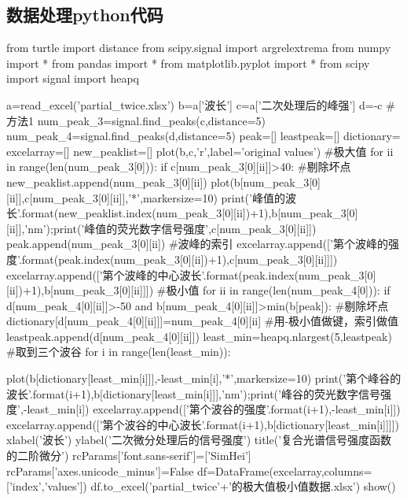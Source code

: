 \documentclass{article}
\numberwithin{equation}{subsection}
\begin{document}
\subsection{数据处理python代码}
\begin{python}
from turtle import distance
from scipy.signal import argrelextrema
from numpy import *
from pandas import *
from matplotlib.pyplot import *
from scipy import signal
import heapq

a=read_excel('partial_twice.xlsx')
b=a['波长']
c=a['二次处理后的峰强']
d=-c
#方法1
num_peak_3=signal.find_peaks(c,distance=5)
num_peak_4=signal.find_peaks(d,distance=5)
peak=[]
leastpeak=[]
dictionary={}
excelarray=[]
new_peaklist=[]
plot(b,c,'r',label='original values')
#极大值
for ii in range(len(num_peak_3[0])):
    if c[num_peak_3[0][ii]]>40:          #剔除坏点
        new_peaklist.append(num_peak_3[0][ii])
        plot(b[num_peak_3[0][ii]],c[num_peak_3[0][ii]],'*',markersize=10) 
        print('峰值{}的波长'.format(new_peaklist.index(num_peak_3[0][ii])+1),b[num_peak_3[0][ii]],'nm');print('峰值的荧光数字信号强度',c[num_peak_3[0][ii]])
        peak.append(num_peak_3[0][ii])          #波峰的索引
        excelarray.append(['第{}个波峰的强度'.format(peak.index(num_peak_3[0][ii])+1),c[num_peak_3[0][ii]]])
        excelarray.append(['第{}个波峰的中心波长'.format(peak.index(num_peak_3[0][ii])+1),b[num_peak_3[0][ii]]])
#极小值
for ii in range(len(num_peak_4[0])):
    if  d[num_peak_4[0][ii]]>-50 and b[num_peak_4[0][ii]]>min(b[peak]):          #剔除坏点
        dictionary[d[num_peak_4[0][ii]]]=num_peak_4[0][ii]          #用-极小值做键，索引做值
        leastpeak.append(d[num_peak_4[0][ii]])
least_min=heapq.nlargest(5,leastpeak)               #取到三个波谷
for i in range(len(least_min)):
    
        plot(b[dictionary[least_min[i]]],-least_min[i],'*',markersize=10) 
        print('第{}个峰谷的波长'.format(i+1),b[dictionary[least_min[i]]],'nm');print('峰谷的荧光数字信号强度',-least_min[i])
        excelarray.append(['第{}个波谷的强度'.format(i+1),-least_min[i]])
        excelarray.append(['第{}个波谷的中心波长'.format(i+1),b[dictionary[least_min[i]]]])
xlabel('波长')
ylabel('二次微分处理后的信号强度')
title('复合光谱信号强度函数的二阶微分')
rcParams['font.sans-serif']=['SimHei']
rcParams['axes.unicode_minus']=False
df=DataFrame(excelarray,columns=['index','values'])
df.to_excel('partial_twice'+'的极大值极小值数据.xlsx')
show()   
\end{python}
\end{document}
